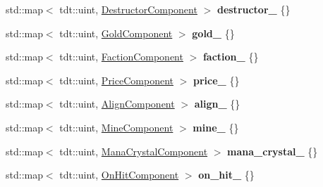 \begin{DoxyCompactItemize}
\item 
std\+::map$<$ tdt\+::uint, \hyperlink{struct_destructor_component}{Destructor\+Component} $>$ {\bfseries destructor\+\_\+} \{\}\hypertarget{class_entity_system_a255f5a0a573340454d88cb3d373523f3}{}\label{class_entity_system_a255f5a0a573340454d88cb3d373523f3}

\item 
std\+::map$<$ tdt\+::uint, \hyperlink{struct_gold_component}{Gold\+Component} $>$ {\bfseries gold\+\_\+} \{\}\hypertarget{class_entity_system_af7d14e35001c78315710b3c1c13c0cdf}{}\label{class_entity_system_af7d14e35001c78315710b3c1c13c0cdf}

\item 
std\+::map$<$ tdt\+::uint, \hyperlink{struct_faction_component}{Faction\+Component} $>$ {\bfseries faction\+\_\+} \{\}\hypertarget{class_entity_system_afcbd1bd503bb0112b65427867f6411ac}{}\label{class_entity_system_afcbd1bd503bb0112b65427867f6411ac}

\item 
std\+::map$<$ tdt\+::uint, \hyperlink{struct_price_component}{Price\+Component} $>$ {\bfseries price\+\_\+} \{\}\hypertarget{class_entity_system_ae9bc022455b06ea73897ca79a0d73171}{}\label{class_entity_system_ae9bc022455b06ea73897ca79a0d73171}

\item 
std\+::map$<$ tdt\+::uint, \hyperlink{struct_align_component}{Align\+Component} $>$ {\bfseries align\+\_\+} \{\}\hypertarget{class_entity_system_a8dc3fef5f4b6d5c0d386aa84e27e76f9}{}\label{class_entity_system_a8dc3fef5f4b6d5c0d386aa84e27e76f9}

\item 
std\+::map$<$ tdt\+::uint, \hyperlink{struct_mine_component}{Mine\+Component} $>$ {\bfseries mine\+\_\+} \{\}\hypertarget{class_entity_system_a84a91531d0b15c06c9dbe24528e6ce6a}{}\label{class_entity_system_a84a91531d0b15c06c9dbe24528e6ce6a}

\item 
std\+::map$<$ tdt\+::uint, \hyperlink{struct_mana_crystal_component}{Mana\+Crystal\+Component} $>$ {\bfseries mana\+\_\+crystal\+\_\+} \{\}\hypertarget{class_entity_system_a4161310db14b4210aa54a76a8879e3e6}{}\label{class_entity_system_a4161310db14b4210aa54a76a8879e3e6}

\item 
std\+::map$<$ tdt\+::uint, \hyperlink{struct_on_hit_component}{On\+Hit\+Component} $>$ {\bfseries on\+\_\+hit\+\_\+} \{\}\hypertarget{class_entity_system_acb74a0737b50fed58e57e87be1304595}{}\label{class_entity_system_acb74a0737b50fed58e57e87be1304595}


\end{DoxyCompactItemize}
